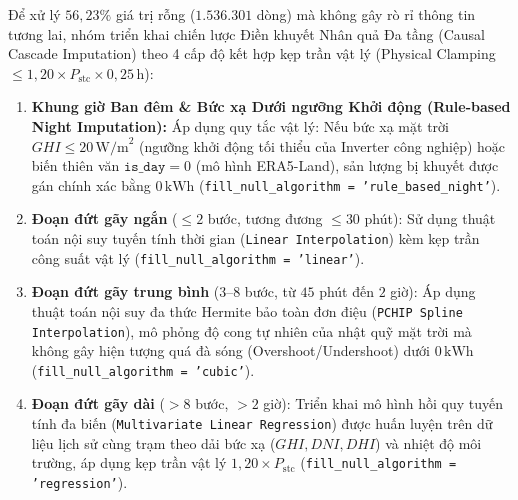 \documentclass[12pt, a4paper]{report}
\begin{document}
Để xử lý $56{,}23\%$ giá trị rỗng ($1.536.301$ dòng) mà không gây rò rỉ thông tin tương lai, nhóm triển khai chiến lược Điền khuyết Nhân quả Đa tầng (Causal Cascade Imputation) theo 4 cấp độ kết hợp kẹp trần vật lý (Physical Clamping $\le 1{,}20 \times P_{\text{stc}} \times 0{,}25\,\text{h}$):

\begin{enumerate}[label=\alph*., leftmargin=*]
    \item \textbf{Khung giờ Ban đêm \& Bức xạ Dưới ngưỡng Khởi động (Rule-based Night Imputation):} Áp dụng quy tắc vật lý: Nếu bức xạ mặt trời $GHI \le 20\,\text{W/m}^2$ (ngưỡng khởi động tối thiểu của Inverter công nghiệp) hoặc biến thiên văn $\texttt{is\_day} = 0$ (mô hình ERA5-Land), sản lượng bị khuyết được gán chính xác bằng $0\,\text{kWh}$ (\texttt{fill\_null\_algorithm = 'rule\_based\_night'}).
    \item \textbf{Đoạn đứt gãy ngắn} ($\le 2$ bước, tương đương $\le 30$ phút): Sử dụng thuật toán nội suy tuyến tính thời gian (\texttt{Linear Interpolation}) kèm kẹp trần công suất vật lý (\texttt{fill\_null\_algorithm = 'linear'}).
    \item \textbf{Đoạn đứt gãy trung bình} ($3$--$8$ bước, từ $45$ phút đến $2$ giờ): Áp dụng thuật toán nội suy đa thức Hermite bảo toàn đơn điệu (\texttt{PCHIP Spline Interpolation}), mô phỏng độ cong tự nhiên của nhật quỹ mặt trời mà không gây hiện tượng quá đà sóng (Overshoot/Undershoot) dưới $0\,\text{kWh}$ (\texttt{fill\_null\_algorithm = 'cubic'}).
    \item \textbf{Đoạn đứt gãy dài} ($> 8$ bước, $> 2$ giờ): Triển khai mô hình hồi quy tuyến tính đa biến (\texttt{Multivariate Linear Regression}) được huấn luyện trên dữ liệu lịch sử cùng trạm theo dải bức xạ ($GHI, DNI, DHI$) và nhiệt độ môi trường, áp dụng kẹp trần vật lý $1{,}20 \times P_{\text{stc}}$ (\texttt{fill\_null\_algorithm = 'regression'}).
\end{enumerate}
\end{document}
